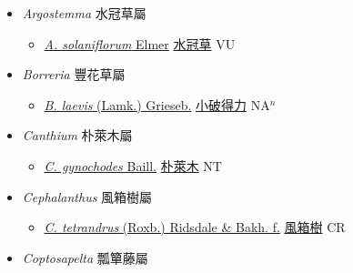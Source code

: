 
  \begin{itemize}
 \item[] \textit{Argostemma} 水冠草屬
                    
  \begin{itemize}
        \item[] \href{http://www.theplantlist.org/tpl1.1/search?q=Argostemma+solaniflorum}{\textit{A. solaniflorum} Elmer}   \href{\detokenize{http://taibnet.sinica.edu.tw/chi/taibnet_species_list.php?T2=水冠草&T2_new_value=true&fr=y}}{水冠草} VU
  \end{itemize}
 \item[] \textit{Borreria} 豐花草屬
                    
  \begin{itemize}
        \item[] \href{http://www.theplantlist.org/tpl1.1/search?q=Borreria+laevis}{\textit{B. laevis} (Lamk.) Grieseb.}   \href{\detokenize{http://taibnet.sinica.edu.tw/chi/taibnet_species_list.php?T2=小破得力&T2_new_value=true&fr=y}}{小破得力} NA$^n$
  \end{itemize}
 \item[] \textit{Canthium} 朴萊木屬
                    
  \begin{itemize}
        \item[] \href{http://www.theplantlist.org/tpl1.1/search?q=Canthium+gynochodes}{\textit{C. gynochodes} Baill.}   \href{\detokenize{http://taibnet.sinica.edu.tw/chi/taibnet_species_list.php?T2=朴萊木&T2_new_value=true&fr=y}}{朴萊木} NT
  \end{itemize}
 \item[] \textit{Cephalanthus} 風箱樹屬
                    
  \begin{itemize}
        \item[] \href{http://www.theplantlist.org/tpl1.1/search?q=Cephalanthus+tetrandrus}{\textit{C. tetrandrus} (Roxb.) Ridsdale \& Bakh. f.}     \href{\detokenize{http://taibnet.sinica.edu.tw/chi/taibnet_species_list.php?T2=風箱樹&T2_new_value=true&fr=y}}{風箱樹} CR
  \end{itemize}
 \item[] \textit{Coptosapelta} 瓢簞藤屬
                    

\end{itemize}
